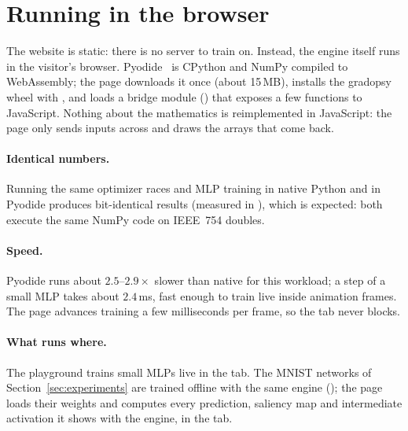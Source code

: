 \section{Running in the browser}
\label{sec:browser}

The website is static: there is no server to train on. Instead, the engine itself runs in the
visitor's browser. Pyodide~\cite{pyodide} is CPython and NumPy compiled to WebAssembly; the page
downloads it once (about 15\,MB), installs the gradopsy wheel with , and loads a
bridge module () that exposes a few functions to JavaScript. Nothing about
the mathematics is reimplemented in JavaScript: the page only sends inputs across and draws the
arrays that come back.

\paragraph{Identical numbers.} Running the same optimizer races and MLP training in native Python
and in Pyodide produces bit-identical results (measured in ), which is expected:
both execute the same NumPy code on IEEE~754 doubles.

\paragraph{Speed.} Pyodide runs about $2.5$--$2.9\times$ slower than native for this workload; a
step of a small MLP takes about $2.4$\,ms, fast enough to train live inside animation frames. The
page advances training a few milliseconds per frame, so the tab never blocks.

\paragraph{What runs where.} The playground trains small MLPs live in the tab. The MNIST networks of
Section~\ref{sec:experiments} are trained offline with the same engine
(); the page loads their weights and computes every prediction,
saliency map and intermediate activation it shows with the engine, in the tab.

